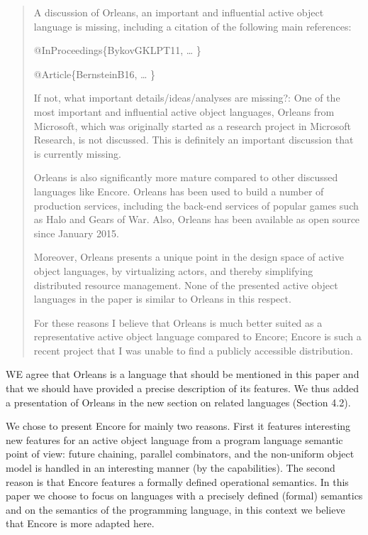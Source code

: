 \documentclass{article}
\begin{document}
\begin{quote}
	 A discussion of Orleans, an important and 
influential active object language is missing, including a citation of the following main 
references:

@InProceedings\{BykovGKLPT11,
\ldots
\}

@Article\{BernsteinB16,
\ldots
\}


If not, what important details/ideas/analyses are missing?: One of the most important and 
influential active object languages, Orleans from Microsoft, which was originally started 
as a research project in Microsoft Research, is not discussed. This is definitely an 
important discussion that is currently missing.

Orleans is also significantly more mature compared to other discussed languages like 
Encore. Orleans has been used to build a number of production services, including the 
back-end services of popular games such as Halo and Gears of War. Also, Orleans has been 
available as open source since January 2015.

Moreover, Orleans presents a unique point in the design space of active object languages, 
by virtualizing actors, and thereby simplifying distributed resource management. None of 
the presented active object languages in the paper is similar to Orleans in this respect.

For these reasons I believe that Orleans is much better suited as a representative active 
object language compared to Encore; Encore is such a recent project that I was unable to 
find a publicly accessible distribution.

\end{quote}
WE agree that Orleans is a language that should be mentioned in this paper and that we 
should have provided a precise description of its features.
We thus added a presentation of Orleans in the new section on related languages 
(Section 4.2).

We chose to present Encore for mainly two reasons. First it 
features interesting new features for an active object language from a program language 
semantic point of view: future chaining, parallel combinators, and the 
non-uniform object model is handled in an interesting manner (by the capabilities). The 
second reason is that 
Encore features a formally defined operational semantics. 
In this paper we choose to focus on languages with a precisely defined (formal) semantics 
and on the  semantics of the programming language, in this context we believe 
that Encore is more adapted here. 
\end{document}
